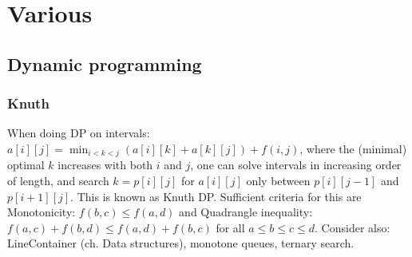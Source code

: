 \chapter{Various}



\section{Dynamic programming}

\subsection{Knuth}
 When doing DP on intervals: $a[i][j] = \min_{i < k < j}(a[i][k] + a[k][j]) + f(i, j)$, where the (minimal) optimal $k$ increases with both $i$ and $j$,
 one can solve intervals in increasing order of length, and search $k = p[i][j]$ for $a[i][j]$ only between $p[i][j-1]$ and $p[i+1][j]$.
 This is known as Knuth DP. Sufficient criteria for this are Monotonicity: $f(b,c) \le f(a,d)$ and Quadrangle inequality: $f(a,c) + f(b,d) \le f(a,d) + f(b,c)$ for all $a \le b \le c \le d$.
 Consider also: LineContainer (ch. Data structures), monotone queues, ternary search.
  


